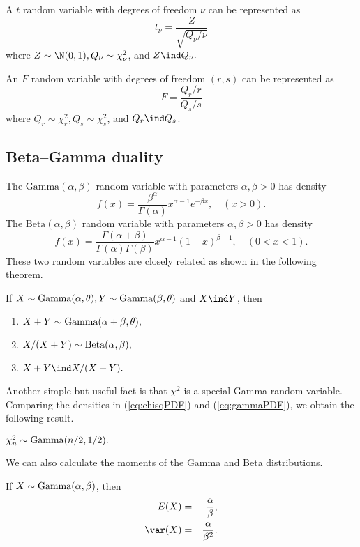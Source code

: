 A $t$ random variable with degrees of freedom $\nu$ can be represented
as 
$$
t_{\nu}=\frac{ Z}{ \sqrt{Q_{\nu}  / \nu }    } 
$$ 
where $Z\sim\N(0,1),Q_{\nu}\sim\chi_{\nu}^{2}$, 
and $Z\ind Q_{\nu}.$ 

An $F$ random variable with degrees of freedom $(r,s)$ can be represented
as
\[
F=\frac{Q_{r}/r}{Q_{s}/s}
\]
where $Q_{r}\sim\chi_{r}^{2},Q_{s}\sim\chi_{s}^{2}$, and $Q_{r}\ind Q_{s}$. 

\subsection{Beta--Gamma duality}

The $\text{Gamma}(\alpha,\beta)$ random variable with parameters
$\alpha,\beta>0$ has density
\begin{equation}
f(x)=\frac{\beta^{\alpha}}{\Gamma(\alpha)}x^{\alpha-1}e^{-\beta x},\quad(x>0).\label{eq:gammaPDF}
\end{equation}
The $\text{Beta}(\alpha,\beta)$ random variable with parameters $\alpha,\beta>0$
has density
\[
f(x)=\frac{\Gamma(\alpha+\beta)}{\Gamma(\alpha)\Gamma(\beta)}x^{\alpha-1}(1-x)^{\beta-1},\quad(0<x<1).
\]
These two random variables are closely related as shown in the following
theorem.
\begin{theorem}
\label{thm:beta-gamma-duality}If $X\sim\textup{Gamma}(\alpha,\theta),Y\sim\textup{Gamma}(\beta,\theta)$
and $X\ind Y$, then
\begin{enumerate}
\item $X+Y\sim\textup{Gamma}(\alpha+\beta,\theta),$
\item $X/(X+Y)\sim\textup{Beta}(\alpha,\beta),$
\item $X+Y\ind X/(X+Y).$
\end{enumerate}
\end{theorem}



Another simple but useful fact is that $\chi^{2}$ is a special Gamma
random variable. Comparing the densities in (\ref{eq:chisqPDF}) and
(\ref{eq:gammaPDF}), we obtain the following result.
\begin{proposition}\label{prop::chi2-gamma}
$\chi_{n}^{2}\sim\textup{Gamma}(n/2,1/2).$
\end{proposition}
We can also calculate the moments of the Gamma and Beta distributions.
\begin{proposition}
\label{thm:gammamoments}If $X\sim\textup{Gamma}(\alpha,\beta)$,
then
\begin{eqnarray*}
E(X) &=&\frac{\alpha}{\beta},\\ 
\var(X) &=&\frac{\alpha}{\beta^{2}}.
\end{eqnarray*}
\end{proposition}


